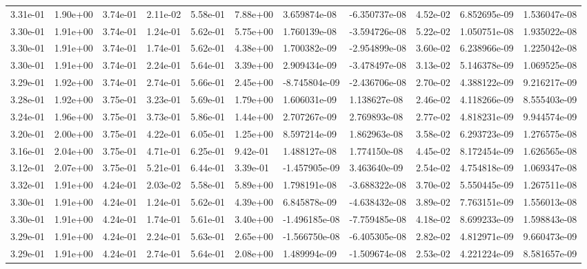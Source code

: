 \begin{longtable}{| p{} | p{} |}
3.31e-01 & 1.90e+00 & 3.74e-01 & 2.11e-02 & 5.58e-01 & 7.88e+00 &  3.659874e-08 & -6.350737e-08 &  4.52e-02 &  6.852695e-09 &  1.536047e-08 \\
3.30e-01 & 1.91e+00 & 3.74e-01 & 1.24e-01 & 5.62e-01 & 5.75e+00 &  1.760139e-08 & -3.594726e-08 &  5.22e-02 &  1.050751e-08 &  1.935022e-08 \\
3.30e-01 & 1.91e+00 & 3.74e-01 & 1.74e-01 & 5.62e-01 & 4.38e+00 &  1.700382e-09 & -2.954899e-08 &  3.60e-02 &  6.238966e-09 &  1.225042e-08 \\
3.30e-01 & 1.91e+00 & 3.74e-01 & 2.24e-01 & 5.64e-01 & 3.39e+00 &  2.909434e-09 & -3.478497e-08 &  3.13e-02 &  5.146378e-09 &  1.069525e-08 \\
3.29e-01 & 1.92e+00 & 3.74e-01 & 2.74e-01 & 5.66e-01 & 2.45e+00 & -8.745804e-09 & -2.436706e-08 &  2.70e-02 &  4.388122e-09 &  9.216217e-09 \\
3.28e-01 & 1.92e+00 & 3.75e-01 & 3.23e-01 & 5.69e-01 & 1.79e+00 &  1.606031e-09 &  1.138627e-08 &  2.46e-02 &  4.118266e-09 &  8.555403e-09 \\
3.24e-01 & 1.96e+00 & 3.75e-01 & 3.73e-01 & 5.86e-01 & 1.44e+00 &  2.707267e-09 &  2.769893e-08 &  2.77e-02 &  4.818231e-09 &  9.944574e-09 \\
3.20e-01 & 2.00e+00 & 3.75e-01 & 4.22e-01 & 6.05e-01 & 1.25e+00 &  8.597214e-09 &  1.862963e-08 &  3.58e-02 &  6.293723e-09 &  1.276575e-08 \\
3.16e-01 & 2.04e+00 & 3.75e-01 & 4.71e-01 & 6.25e-01 & 9.42e-01 &  1.488127e-08 &  1.774150e-08 &  4.45e-02 &  8.172454e-09 &  1.626565e-08 \\
3.12e-01 & 2.07e+00 & 3.75e-01 & 5.21e-01 & 6.44e-01 & 3.39e-01 & -1.457905e-09 &  3.463640e-09 &  2.54e-02 &  4.754818e-09 &  1.069347e-08 \\
3.32e-01 & 1.91e+00 & 4.24e-01 & 2.03e-02 & 5.58e-01 & 5.89e+00 &  1.798191e-08 & -3.688322e-08 &  3.70e-02 &  5.550445e-09 &  1.267511e-08 \\
3.30e-01 & 1.91e+00 & 4.24e-01 & 1.24e-01 & 5.62e-01 & 4.39e+00 &  6.845878e-09 & -4.638432e-08 &  3.89e-02 &  7.763151e-09 &  1.556013e-08 \\
3.30e-01 & 1.91e+00 & 4.24e-01 & 1.74e-01 & 5.61e-01 & 3.40e+00 & -1.496185e-08 & -7.759485e-08 &  4.18e-02 &  8.699233e-09 &  1.598843e-08 \\
3.29e-01 & 1.91e+00 & 4.24e-01 & 2.24e-01 & 5.63e-01 & 2.65e+00 & -1.566750e-08 & -6.405305e-08 &  2.82e-02 &  4.812971e-09 &  9.660473e-09 \\
3.29e-01 & 1.91e+00 & 4.24e-01 & 2.74e-01 & 5.64e-01 & 2.08e+00 &  1.489994e-09 & -1.509674e-08 &  2.53e-02 &  4.221224e-09 &  8.581657e-09 \\

\end{longtable}
